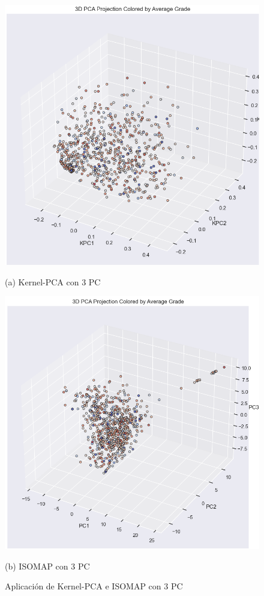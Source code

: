 \documentclass{article}
\begin{document}
\begin{figure}[h!]
  \centering
  \begin{minipage}[b]{0.45\textwidth}
      \centering
      \includegraphics[scale=0.28]{KernelPCA3.png}
      \caption*{(a) Kernel-PCA con 3 PC}
  \end{minipage}
  \hfill
  \begin{minipage}[b]{0.45\textwidth}
      \centering
      \includegraphics[scale=0.28]{ISOMAP3.png}
      \caption*{(b) ISOMAP con 3 PC}
  \end{minipage}
  \caption{Aplicación de Kernel-PCA e ISOMAP con 3 PC}
\end{figure}
\end{document}
